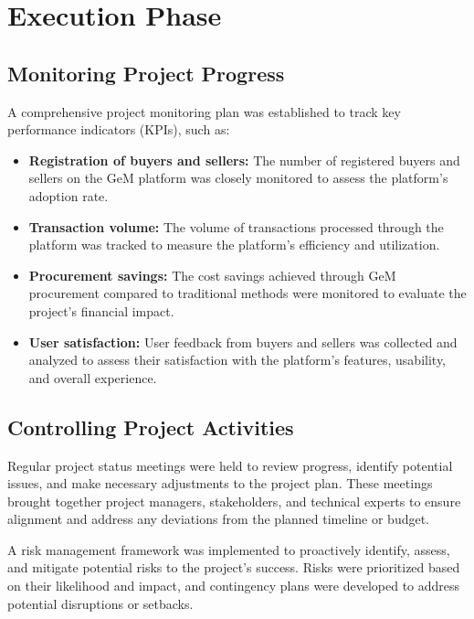 \section{Execution Phase}
\subsection{Monitoring Project Progress}

A comprehensive project monitoring plan was established to track key performance indicators (KPIs), such as:

\begin{itemize}
    \item \textbf{Registration of buyers and sellers:} The number of registered buyers and sellers on the GeM platform was closely monitored to assess the platform's adoption rate.
    
    \item \textbf{Transaction volume:} The volume of transactions processed through the platform was tracked to measure the platform's efficiency and utilization.
    
    \item \textbf{Procurement savings:} The cost savings achieved through GeM procurement compared to traditional methods were monitored to evaluate the project's financial impact.
    
    \item \textbf{User satisfaction:} User feedback from buyers and sellers was collected and analyzed to assess their satisfaction with the platform's features, usability, and overall experience.
\end{itemize}

\subsection{Controlling Project Activities}

Regular project status meetings were held to review progress, identify potential issues, and make necessary adjustments to the project plan. These meetings brought together project managers, stakeholders, and technical experts to ensure alignment and address any deviations from the planned timeline or budget.

A risk management framework was implemented to proactively identify, assess, and mitigate potential risks to the project's success. Risks were prioritized based on their likelihood and impact, and contingency plans were developed to address potential disruptions or setbacks.

